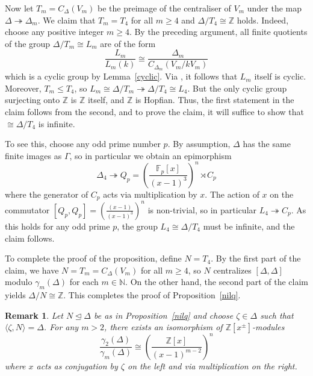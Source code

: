 \documentclass{amsart}
\numberwithin{theorem}{section}
\numberwithin{equation}{section}
\newtheorem{remark}[theorem]{Remark}
\newcommand{\Z}{\mathbb{Z}}
\begin{document}
Now let $T_m = C_\Delta(V_m)$ be the preimage of the centraliser of $V_m$ under the map $\Delta \twoheadrightarrow \Delta_m$. We claim that $T_m = T_4$ for all $m \geq 4$ and $\Delta / T_4 \cong \Z$ holds. Indeed, choose any positive integer $m \geq 4$. By the preceding argument, all finite quotients of the group $\Delta / T_m \cong L_m$ are of the form
\[
\frac{L_m}{L_m(k)} \cong \frac{\Delta_m}{C_{\Delta_m}(V_m/kV_m)}
\] which is a cyclic group by Lemma~\ref{cyclic}. Via \cite[Corollary 3.2.12]{Wilkes2024}, it follows that $L_m$ itself is cyclic. Moreover, $T_m \leq T_4$, so $L_m \cong \Delta / T_{m} \twoheadrightarrow \Delta / T_4 \cong L_4$. But the only cyclic group surjecting onto $\Z$ is $\Z$ itself, and $\Z$ is Hopfian. Thus, the first statement in the claim follows from the second, and to prove the claim, it will suffice to show that $\cong \Delta / T_4$ is infinite. 

To see this, choose any odd prime number $p$. By assumption, $\Delta$ has the same finite images as $\Gamma$, so in particular we obtain an epimorphism 
\[
\Delta_4 \twoheadrightarrow Q_p = \left(\frac{\mathbb{F}_p[x]}{(x-1)^3}\right)^n \rtimes C_p
\] where the generator of $C_p$ acts via multiplication by $x$. The action of $x$ on the commutator $[Q_p, Q_p ] = \left(\frac{(x-1)}{(x-1)^3}\right)^n$ is non-trivial, so in particular $L_4 \twoheadrightarrow C_p$. As this holds for any odd prime $p$, the group $L_4 \cong \Delta / T_4 $ must be infinite, and the claim follows.

To complete the proof of the proposition, define $N = T_4$. By the first part of the claim, we have $N = T_m = C_\Delta(V_m)$ for all $m \geq 4$, so $N$ centralizes $[\Delta, \Delta]$ modulo $\gamma_m(\Delta)$ for each $m \in \mathbb{N}$. On the other hand, the second part of the claim yields $\Delta / N \cong \Z$. This completes the proof of  Proposition~\ref{nilq}.

\begin{remark}\label{Rem::ModuleDescription}
    Let $N \trianglelefteq \Delta$ be as in Proposition~\ref{nilq} and choose $\zeta \in \Delta$ such that $\langle \zeta, N \rangle = \Delta$. For any $m > 2$, there exists an isomorphism of $\Z[x^\pm]$-modules
    \[
    \frac{\gamma_2(\Delta)}{\gamma_m(\Delta)} \cong \left(\frac{\Z[x]}{(x-1)^{m-2}}\right)^n
    \]
    where $x$ acts as conjugation by $\zeta$ on the left and via multiplication on the right.
\end{remark}
\end{document}
